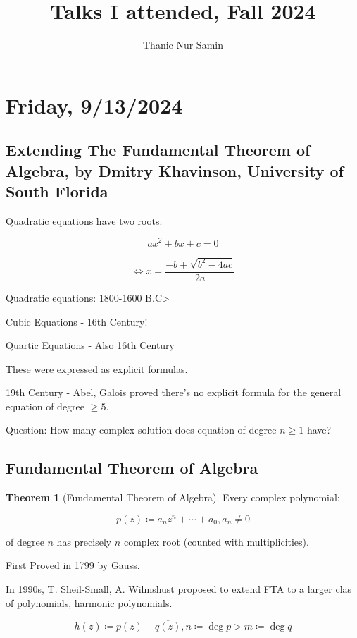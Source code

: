\documentclass{article}
\title{Talks I attended, Fall 2024}
\author{Thanic Nur Samin}
\date{\vspace{-5ex}}
\theoremstyle{definition}
\newtheorem{theorem}{Theorem}
\begin{document}
\maketitle


\section*{Friday, 9/13/2024}

\subsection*{\centering Extending The Fundamental Theorem of Algebra, by Dmitry Khavinson, University of South Florida}

Quadratic equations have two roots.

\[
    ax^2 + bx + c = 0
\]

\[
    \iff x = \frac{-b+\sqrt{b^2 - 4ac}}{2a}
\]

Quadratic equations: 1800-1600 B.C>

Cubic Equations - 16th Century!

Quartic Equations - Also 16th Century

These were expressed as explicit formulas.

19th Century - Abel, Galois proved there's no explicit formula for the general equation of degree \(\geq 5\).

Question: How many complex solution does equation of degree \(n\geq 1\) have?

\subsection*{Fundamental Theorem of Algebra}

\begin{theorem}[Fundamental Theorem of Algebra]
    Every complex polynomial:

    \[
        p(z) \coloneqq  a_n z^n + \cdots + a_0, a_n \neq 0
    \]

    of degree \(n\) has precisely \(n\) complex root (counted with multiplicities).
\end{theorem}

First Proved in 1799 by Gauss.

In 1990s, T. Sheil-Small, A. Wilmshust proposed to extend FTA to a larger clas of polynomials, \underline{harmonic polynomials}.

\[
    h(z) \coloneqq p(z) - \overline{q(z)}, n \coloneqq \deg p > m \coloneqq \deg q
\]
\end{document}
